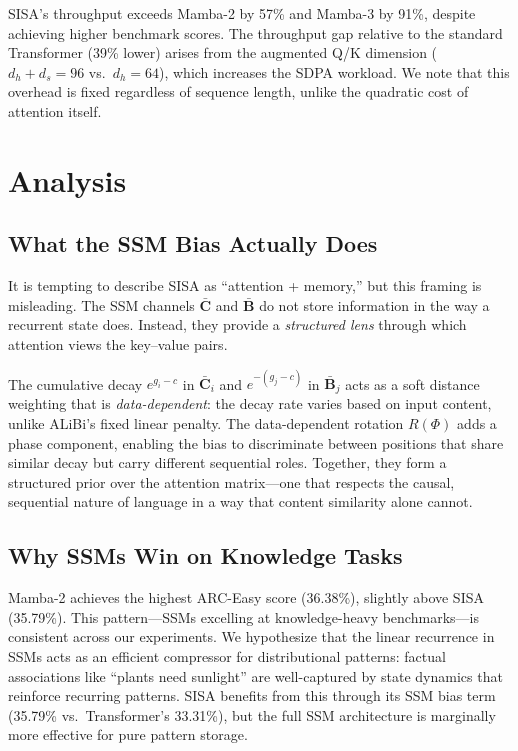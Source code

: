 \documentclass[11pt]{article}
\begin{document}
SISA's throughput exceeds Mamba-2 by 57\% and Mamba-3 by 91\%, despite achieving higher benchmark scores. The throughput gap relative to the standard Transformer (39\% lower) arises from the augmented Q/K dimension ($d_h + d_s = 96$ vs.\ $d_h = 64$), which increases the SDPA workload. We note that this overhead is fixed regardless of sequence length, unlike the quadratic cost of attention itself.

\section{Analysis}

\subsection{What the SSM Bias Actually Does}

It is tempting to describe SISA as ``attention + memory,'' but this framing is misleading. The SSM channels $\bar{\mathbf{C}}$ and $\bar{\mathbf{B}}$ do not store information in the way a recurrent state does. Instead, they provide a \emph{structured lens} through which attention views the key--value pairs.

The cumulative decay $e^{g_i - c}$ in $\bar{\mathbf{C}}_i$ and $e^{-(g_j - c)}$ in $\bar{\mathbf{B}}_j$ acts as a soft distance weighting that is \emph{data-dependent}: the decay rate varies based on input content, unlike ALiBi's fixed linear penalty. The data-dependent rotation $R(\Phi)$ adds a phase component, enabling the bias to discriminate between positions that share similar decay but carry different sequential roles. Together, they form a structured prior over the attention matrix---one that respects the causal, sequential nature of language in a way that content similarity alone cannot.

\subsection{Why SSMs Win on Knowledge Tasks}

Mamba-2 achieves the highest ARC-Easy score (36.38\%), slightly above SISA (35.79\%). This pattern---SSMs excelling at knowledge-heavy benchmarks---is consistent across our experiments. We hypothesize that the linear recurrence in SSMs acts as an efficient compressor for distributional patterns: factual associations like ``plants need sunlight'' are well-captured by state dynamics that reinforce recurring patterns. SISA benefits from this through its SSM bias term (35.79\% vs.\ Transformer's 33.31\%), but the full SSM architecture is marginally more effective for pure pattern storage.
\end{document}
